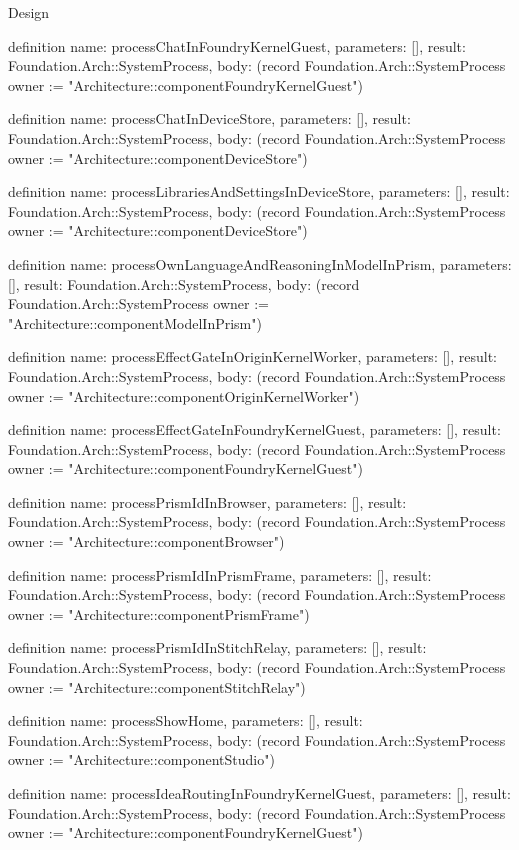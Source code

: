 \begin{lexlean}{Design}
\begin{semanticmodule}
definition{
  name: processChatInFoundryKernelGuest,
  parameters: [],
  result: Foundation.Arch::SystemProcess,
  body: (record Foundation.Arch::SystemProcess {owner := "Architecture::componentFoundryKernelGuest"})
}

definition{
  name: processChatInDeviceStore,
  parameters: [],
  result: Foundation.Arch::SystemProcess,
  body: (record Foundation.Arch::SystemProcess {owner := "Architecture::componentDeviceStore"})
}

definition{
  name: processLibrariesAndSettingsInDeviceStore,
  parameters: [],
  result: Foundation.Arch::SystemProcess,
  body: (record Foundation.Arch::SystemProcess {owner := "Architecture::componentDeviceStore"})
}

definition{
  name: processOwnLanguageAndReasoningInModelInPrism,
  parameters: [],
  result: Foundation.Arch::SystemProcess,
  body: (record Foundation.Arch::SystemProcess {owner := "Architecture::componentModelInPrism"})
}

definition{
  name: processEffectGateInOriginKernelWorker,
  parameters: [],
  result: Foundation.Arch::SystemProcess,
  body: (record Foundation.Arch::SystemProcess {owner := "Architecture::componentOriginKernelWorker"})
}

definition{
  name: processEffectGateInFoundryKernelGuest,
  parameters: [],
  result: Foundation.Arch::SystemProcess,
  body: (record Foundation.Arch::SystemProcess {owner := "Architecture::componentFoundryKernelGuest"})
}

definition{
  name: processPrismIdInBrowser,
  parameters: [],
  result: Foundation.Arch::SystemProcess,
  body: (record Foundation.Arch::SystemProcess {owner := "Architecture::componentBrowser"})
}

definition{
  name: processPrismIdInPrismFrame,
  parameters: [],
  result: Foundation.Arch::SystemProcess,
  body: (record Foundation.Arch::SystemProcess {owner := "Architecture::componentPrismFrame"})
}

definition{
  name: processPrismIdInStitchRelay,
  parameters: [],
  result: Foundation.Arch::SystemProcess,
  body: (record Foundation.Arch::SystemProcess {owner := "Architecture::componentStitchRelay"})
}

definition{
  name: processShowHome,
  parameters: [],
  result: Foundation.Arch::SystemProcess,
  body: (record Foundation.Arch::SystemProcess {owner := "Architecture::componentStudio"})
}

definition{
  name: processIdeaRoutingInFoundryKernelGuest,
  parameters: [],
  result: Foundation.Arch::SystemProcess,
  body: (record Foundation.Arch::SystemProcess {owner := "Architecture::componentFoundryKernelGuest"})
}


\end{semanticmodule}
\end{lexlean}
